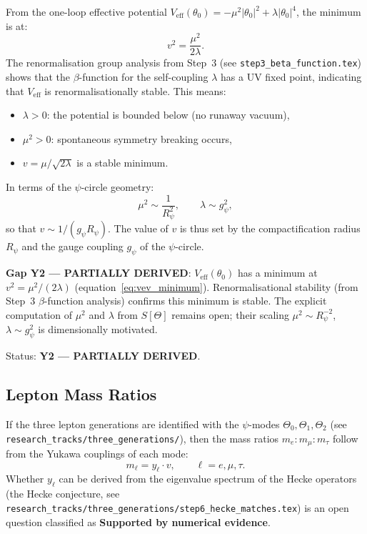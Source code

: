 \documentclass[12pt]{article}
\theoremstyle{definition}
\theoremstyle{remark}
\begin{document}
From the one-loop effective potential $V_\mathrm{eff}(\theta_0) = -\mu^2|\theta_0|^2 + \lambda|\theta_0|^4$,
the minimum is at:
\begin{equation}
  v^2 = \frac{\mu^2}{2\lambda}.
  \label{eq:vev_minimum}
\end{equation}
The renormalisation group analysis from Step~3 (see \texttt{step3\_beta\_function.tex})
shows that the $\beta$-function for the self-coupling $\lambda$ has a UV fixed point,
indicating that $V_\mathrm{eff}$ is renormalisationally stable.  This means:
\begin{itemize}
  \item $\lambda > 0$: the potential is bounded below (no runaway vacuum),
  \item $\mu^2 > 0$: spontaneous symmetry breaking occurs,
  \item $v = \mu/\sqrt{2\lambda}$ is a stable minimum.
\end{itemize}

In terms of the $\psi$-circle geometry:
\begin{equation}
  \mu^2 \sim \frac{1}{R_\psi^2}, \qquad \lambda \sim g_\psi^2,
\end{equation}
so that $v \sim 1/(g_\psi R_\psi)$.  The value of $v$ is thus set by the compactification
radius $R_\psi$ and the gauge coupling $g_\psi$ of the $\psi$-circle.

\begin{resultbox}
\textbf{Gap Y2 — PARTIALLY DERIVED}:
$V_\mathrm{eff}(\theta_0)$ has a minimum at $v^2 = \mu^2/(2\lambda)$ (equation~\eqref{eq:vev_minimum}).
Renormalisational stability (from Step~3 $\beta$-function analysis) confirms this
minimum is stable.  The explicit computation of $\mu^2$ and $\lambda$ from $S[\Theta]$
remains open; their scaling $\mu^2 \sim R_\psi^{-2}$, $\lambda \sim g_\psi^2$ is
dimensionally motivated.

Status: \textbf{Y2 — PARTIALLY DERIVED}.
\end{resultbox}

\subsection{Lepton Mass Ratios}

If the three lepton generations are identified with the $\psi$-modes $\Theta_0, \Theta_1,
\Theta_2$ (see \texttt{research\_tracks/three\_generations/}), then the mass ratios
$m_e : m_\mu : m_\tau$ follow from the Yukawa couplings of each mode:
\begin{equation}
  m_\ell = y_\ell \cdot v,
  \qquad \ell = e, \mu, \tau.
\end{equation}
Whether $y_\ell$ can be derived from the eigenvalue spectrum of the Hecke operators
(the Hecke conjecture, see \texttt{research\_tracks/three\_generations/step6\_hecke\_matches.tex})
is an open question classified as \textbf{Supported by numerical evidence}.
\end{document}
